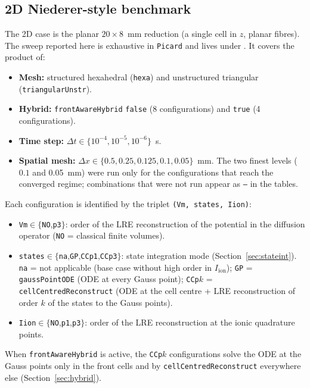 \documentclass[11pt,a4paper]{article}
\newcommand{\code}[1]{\texttt{\small #1}}
\newcommand{\Iion}{I_{\mathrm{ion}}}
\begin{document}
\subsection{2D Niederer-style benchmark}
\label{sec:results:2D}

The 2D case is the planar $20\times 8$~mm reduction (a single cell in $z$, planar
fibres). The sweep reported here is exhaustive in \code{Picard} and lives under
.
It covers the product of:
\begin{itemize}[topsep=2pt,itemsep=1pt]
  \item \textbf{Mesh:} structured hexahedral (\code{hexa}) and unstructured
        triangular (\code{triangularUnstr}).
  \item \textbf{Hybrid:} \code{frontAwareHybrid} \code{false} (8 configurations) and
        \code{true} (4 configurations).
  \item \textbf{Time step:} $\Delta t\in\{10^{-4},10^{-5},10^{-6}\}$~s.
  \item \textbf{Spatial mesh:} $\Delta x\in\{0.5,0.25,0.125,0.1,0.05\}$~mm. The two
        finest levels ($0.1$ and \SI{0.05}{mm}) were run only for the
        configurations that reach the converged regime; combinations that were not
        run appear as \texttt{--} in the tables.
\end{itemize}
Each configuration is identified by the triplet \code{(Vm, states, Iion)}:
\begin{itemize}[topsep=2pt,itemsep=1pt]
  \item \code{Vm}$\in\{$\code{NO},\code{p3}$\}$: order of the LRE reconstruction of the
        potential in the diffusion operator (\code{NO} = classical finite volumes).
  \item \code{states}$\in\{$\code{na},\code{GP},\code{CCp1},\code{CCp3}$\}$: state
        integration mode (Section~\ref{sec:stateint}). \code{na} = not applicable
        (base case without high order in $\Iion$); \code{GP} = \code{gaussPointODE} (ODE
        at every Gauss point); \code{CCp$k$} = \code{cellCentredReconstruct} (ODE
        at the cell centre + LRE reconstruction of order $k$ of the states to the
        Gauss points).
  \item \code{Iion}$\in\{$\code{NO},\code{p1},\code{p3}$\}$: order of the LRE
        reconstruction at the ionic quadrature points.
\end{itemize}
When \code{frontAwareHybrid} is active, the \code{CCp$k$} configurations
solve the ODE at the Gauss points only in the front cells and by
\code{cellCentredReconstruct} everywhere else (Section~\ref{sec:hybrid}).
\end{document}
